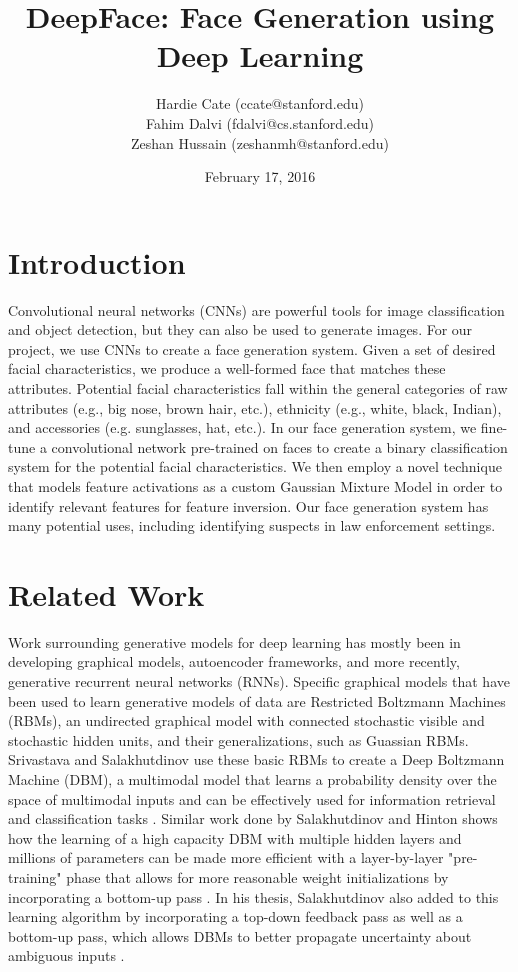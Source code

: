 \documentclass[twocolumn]{article}
\title{DeepFace: Face Generation using Deep Learning}
\author{Hardie Cate (ccate@stanford.edu)\\ Fahim Dalvi (fdalvi@cs.stanford.edu) \\ Zeshan Hussain (zeshanmh@stanford.edu)}
\date{February 17, 2016}
\begin{document}
\maketitle

\section{Introduction}
Convolutional neural networks (CNNs) are powerful tools for image classification and object detection, but they can also be used to generate images. For our project, we use CNNs to create a face generation system. Given a set of desired facial characteristics, we produce a well-formed face that matches these attributes. Potential facial characteristics fall within the general categories of raw attributes (e.g., big nose, brown hair, etc.), ethnicity (e.g., white, black, Indian), and accessories (e.g. sunglasses, hat, etc.). In our face generation system, we fine-tune a convolutional network pre-trained on faces to create a binary classification system for the potential facial characteristics. We then employ a novel technique that models feature activations as a custom Gaussian Mixture Model in order to identify relevant features for feature inversion. Our face generation system has many potential uses, including identifying suspects in law enforcement settings.

\section{Related Work}
Work surrounding generative models for deep learning has mostly been in developing graphical models, autoencoder frameworks, and more recently, generative recurrent neural networks (RNNs). Specific graphical models that have been used to learn generative models of data are Restricted Boltzmann Machines (RBMs), an undirected graphical model with connected stochastic visible and stochastic hidden units, and their generalizations, such as Guassian RBMs. Srivastava and Salakhutdinov use these basic RBMs to create a Deep Boltzmann Machine (DBM), a multimodal model that learns a probability density over the space of multimodal inputs and can be effectively used for information retrieval and classification tasks \cite{NIPS2012_4683}. Similar work done by Salakhutdinov and Hinton shows how the learning of a high capacity DBM with multiple hidden layers and millions of parameters can be made more efficient with a layer-by-layer "pre-training" phase that allows for more reasonable weight initializations by incorporating a bottom-up pass \cite{salakhutdinov2009deep}. In his thesis, Salakhutdinov also added to this learning algorithm by incorporating a top-down feedback pass as well as a bottom-up pass, which allows DBMs to better propagate uncertainty about ambiguous inputs \cite{salakhutdinov2009learning}.
\end{document}
